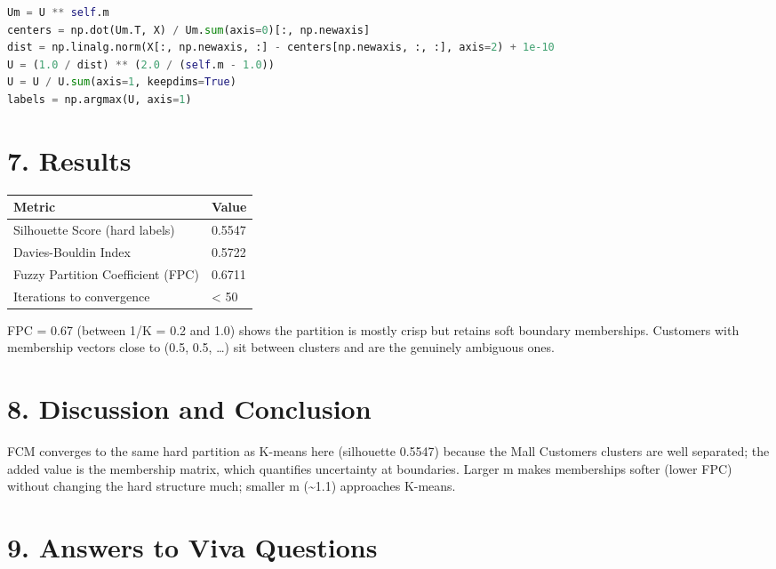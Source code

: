 \begin{lstlisting}[language=Python]
Um = U ** self.m
centers = np.dot(Um.T, X) / Um.sum(axis=0)[:, np.newaxis]
dist = np.linalg.norm(X[:, np.newaxis, :] - centers[np.newaxis, :, :], axis=2) + 1e-10
U = (1.0 / dist) ** (2.0 / (self.m - 1.0))
U = U / U.sum(axis=1, keepdims=True)
labels = np.argmax(U, axis=1)
\end{lstlisting}

\section{7. Results}\label{results-2}

{\def\LTcaptype{none} %
\begin{longtable}[]{@{}ll@{}}
\toprule\noalign{}
Metric & Value \\
\midrule\noalign{}
\endhead
\bottomrule\noalign{}
\endlastfoot
Silhouette Score (hard labels) & 0.5547 \\
Davies-Bouldin Index & 0.5722 \\
Fuzzy Partition Coefficient (FPC) & 0.6711 \\
Iterations to convergence & \textless{} 50 \\
\end{longtable}
}

FPC = 0.67 (between 1/K = 0.2 and 1.0) shows the partition is mostly
crisp but retains soft boundary memberships. Customers with membership
vectors close to (0.5, 0.5, \ldots) sit between clusters and are the
genuinely ambiguous ones.

\section{8. Discussion and
Conclusion}\label{discussion-and-conclusion-2}

FCM converges to the same hard partition as K-means here (silhouette
0.5547) because the Mall Customers clusters are well separated; the
added value is the membership matrix, which quantifies uncertainty at
boundaries. Larger m makes memberships softer (lower FPC) without
changing the hard structure much; smaller m (\textasciitilde1.1)
approaches K-means.

\section{9. Answers to Viva
Questions}\label{answers-to-viva-questions-2}


